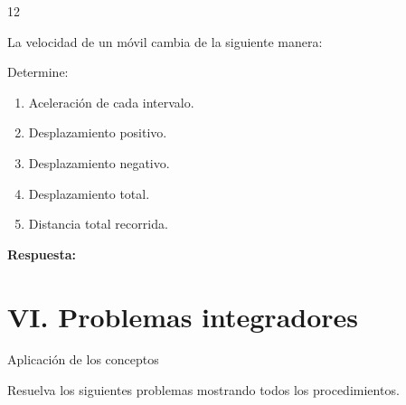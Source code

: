 \documentclass[11pt,letterpaper]{article}
\newcommand{\respuesta}{
 \par\vspace{0.3cm}
 \textcolor{morado}{\textbf{Respuesta:}}
 \hrulefill
 \par\vspace{0.3cm}
}
\newcommand{\espacio}[1]{
 \par\vspace{#1}
}
\begin{document}
\begin{ejercicio}{12}

La velocidad de un móvil
cambia de la siguiente manera:

\begin{center}
\end{center}

Determine:

\begin{enumerate}[label=\alph*)]
\item Aceleración de cada intervalo.
\item Desplazamiento positivo.
\item Desplazamiento negativo.
\item Desplazamiento total.
\item Distancia total recorrida.
\end{enumerate}

\espacio{3cm}
\respuesta

\end{ejercicio}

\newpage

\section*{VI. Problemas integradores}

\begin{seccion}{
Aplicación de los conceptos
}

Resuelva los siguientes problemas
mostrando todos los procedimientos.

\end{seccion}
\end{document}
